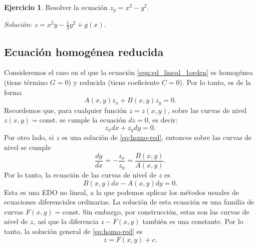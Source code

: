 \documentclass[11pt,letterpaper,draft]{report}
\theoremstyle{plain}
\theoremstyle{definition}
\newtheorem{exercise}[theorem]{Ejercicio}
\theoremstyle{remark}
\newcommand\<{\langle}
\renewcommand\>{\rangle}
\newcommand\const{\mathrm{const}}
\begin{document}
\begin{exercise}
  Resolver la ecuación \(z_y=x^{2}-y^{2}\).

  \emph{Solución:} \(z=x^{2}y-\frac{1}{3}y^{2}+g(x)\).
\end{exercise}

\subsection{Ecuación homogénea reducida}
\label{ssec:homo-red}

Consideremos el caso en el que la ecuación
\ref{eqn:ed_lineal_1orden} es homogénea (tiene término \(G=0\))
y reducida (tiene coeficiente \(C=0\)).
Por lo tanto, es de la forma
\begin{equation}
  \label{eq:homo-red}
  A(x,y) z_x + B(x,y) z_y = 0
.\end{equation}
Recordemos que, para cualquier función \(z=z(x,y)\), sobre las curvas
de nivel \(z(x,y)=\const.\) se cumple la ecuación \(dz=0\), es
decir:
\begin{equation}
  z_x dx + z_y dy = 0
.\end{equation}
Por otro lado, si \(z\) es una solución de \eqref{eq:homo-red},
entonces sobre las curvas de nivel se cumple
\begin{equation}
  \frac{dy}{dx} = -\frac{z_x}{z_y} = \frac{B(x,y)}{A(x,y)}
.\end{equation}
Por lo tanto, la ecuación de las curvas de nivel de \(z\) es
\begin{equation}
  B(x,y)dx - A(x,y)dy = 0
.\end{equation}
Esta es una EDO no lineal, a la que podemos aplicar los métodos
usuales de ecuaciones diferenciales ordinarias.
La solución de esta ecuación es una familia de curvas
\(F(x,y)=\const\).
Sin embargo, por construcción, estas son las curvas de nivel de \(z\),
así que la diferencia \(z-F(x,y)\) también es una constante. Por lo
tanto, la solución general de \eqref{eq:homo-red} es
\begin{equation}
  z=F(x,y)+c
.\end{equation}
\end{document}
